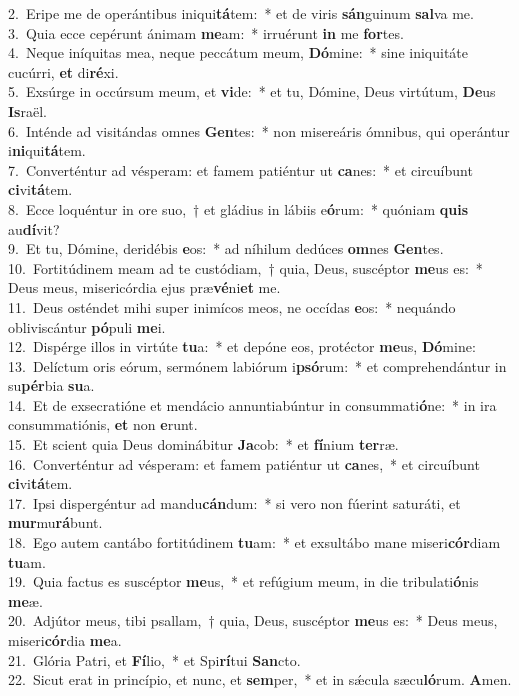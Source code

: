 {2.~}Eripe me de operántibus iniqui\textbf{tá}tem:~* et de viris \textbf{sán}guinum \textbf{sal}va me.\\
{3.~}Quia ecce cepérunt ánimam \textbf{me}am:~* irruérunt \textbf{in} me \textbf{for}tes.\\
{4.~}Neque iníquitas mea, neque peccátum meum, \textbf{Dó}mine:~* sine iniquitáte cucúrri, \textbf{et} di\textbf{ré}xi.\\
{5.~}Exsúrge in occúrsum meum, et \textbf{vi}de:~* et tu, Dómine, Deus virtútum, \textbf{De}us \textbf{Is}raël.\\
{6.~}Inténde ad visitándas omnes \textbf{Gen}tes:~* non misereáris ómnibus, qui operántur i\textbf{ni}qui\textbf{tá}tem.\\
{7.~}Converténtur ad vésperam: et famem patiéntur ut \textbf{ca}nes:~* et circuíbunt \textbf{ci}vi\textbf{tá}tem.\\
{8.~}Ecce loquéntur in ore suo,~† et gládius in lábiis e\textbf{ó}rum:~* quóniam \textbf{quis} au\textbf{dí}vit?\\
{9.~}Et tu, Dómine, deridébis \textbf{e}os:~* ad níhilum dedúces \textbf{om}nes \textbf{Gen}tes.\\
{10.~}Fortitúdinem meam ad te custódiam,~† quia, Deus, suscéptor \textbf{me}us es:~* Deus meus, misericórdia ejus præ\textbf{vé}ni\textbf{et} me.\\
{11.~}Deus osténdet mihi super inimícos meos, ne occídas \textbf{e}os:~* nequándo obliviscántur \textbf{pó}puli \textbf{me}i.\\
{12.~}Dispérge illos in virtúte \textbf{tu}a:~* et depóne eos, protéctor \textbf{me}us, \textbf{Dó}mine:\\
{13.~}Delíctum oris eórum, sermónem labiórum i\textbf{psó}rum:~* et comprehendántur in su\textbf{pér}bia \textbf{su}a.\\
{14.~}Et de exsecratióne et mendácio annuntiabúntur in consummati\textbf{ó}ne:~* in ira consummatiónis, \textbf{et} non \textbf{e}runt.\\
{15.~}Et scient quia Deus dominábitur \textbf{Ja}cob:~* et \textbf{fí}nium \textbf{ter}ræ.\\
{16.~}Converténtur ad vésperam: et famem patiéntur ut \textbf{ca}nes,~* et circuíbunt \textbf{ci}vi\textbf{tá}tem.\\
{17.~}Ipsi dispergéntur ad mandu\textbf{cán}dum:~* si vero non fúerint saturáti, et \textbf{mur}mu\textbf{rá}bunt.\\
{18.~}Ego autem cantábo fortitúdinem \textbf{tu}am:~* et exsultábo mane miseri\textbf{cór}diam \textbf{tu}am.\\
{19.~}Quia factus es suscéptor \textbf{me}us,~* et refúgium meum, in die tribulati\textbf{ó}nis \textbf{me}æ.\\
{20.~}Adjútor meus, tibi psallam,~† quia, Deus, suscéptor \textbf{me}us es:~* Deus meus, miseri\textbf{cór}dia \textbf{me}a.\\
{21.~}Glória Patri, et \textbf{Fí}lio,~* et Spi\textbf{rí}tui \textbf{San}cto.\\
{22.~}Sicut erat in princípio, et nunc, et \textbf{sem}per,~* et in sǽcula sæcu\textbf{ló}rum. \textbf{A}men.\\
